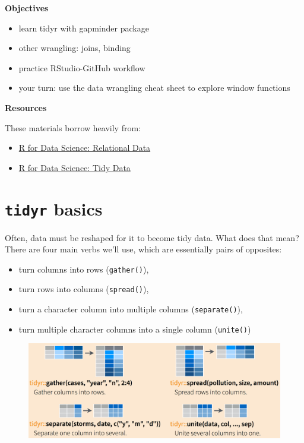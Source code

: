 \documentclass[]{book}
\providecommand{\tightlist}{%
  \setlength{\itemsep}{0pt}\setlength{\parskip}{0pt}}
\theoremstyle{definition}
\theoremstyle{definition}
\theoremstyle{definition}
\theoremstyle{remark}
\begin{document}
\textbf{Objectives}

\begin{itemize}
\tightlist
\item
  learn tidyr with gapminder package
\item
  other wrangling: joins, binding
\item
  practice RStudio-GitHub workflow
\item
  your turn: use the data wrangling cheat sheet to explore window
  functions
\end{itemize}

\textbf{Resources}

These materials borrow heavily from:

\begin{itemize}
\tightlist
\item
  \href{http://r4ds.had.co.nz/relational-data}{R for Data Science:
  Relational Data}
\item
  \href{http://r4ds.had.co.nz/tidy-data.html\#spreading-and-gathering}{R
  for Data Science: Tidy Data}
\end{itemize}

\section{\texorpdfstring{\texttt{tidyr}
basics}{tidyr basics}}\label{tidyr-basics}

Often, data must be reshaped for it to become tidy data. What does that
mean? There are four main verbs we'll use, which are essentially pairs
of opposites:

\begin{itemize}
\tightlist
\item
  turn columns into rows (\texttt{gather()}),
\item
  turn rows into columns (\texttt{spread()}),
\item
  turn a character column into multiple columns (\texttt{separate()}),
\item
  turn multiple character columns into a single column
  (\texttt{unite()})
\end{itemize}

\begin{figure}[htbp]
\centering
\includegraphics{img/rstudio-cheatsheet-spread-gather-sep-unite.png}
\caption{}
\end{figure}
\end{document}
